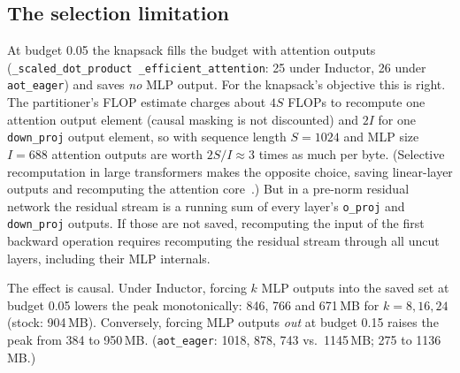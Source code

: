\documentclass[10pt]{article}
\newcommand{\code}[1]{\texttt{#1}}
\begin{document}
\subsection{The selection limitation}
At budget 0.05 the knapsack fills the budget with attention outputs (\code{\_scaled\_dot\_product\allowbreak
\_efficient\_attention}: 25 under Inductor, 26 under \code{aot\_eager}) and saves \emph{no} MLP output. For the knapsack's
objective this is right. The partitioner's FLOP estimate charges about $4S$ FLOPs to recompute one attention output
element (causal masking is not discounted) and $2I$ for one \code{down\_proj} output element, so with sequence length
$S=1024$ and MLP size $I=688$ attention outputs are worth $2S/I\approx3$ times as much per byte. (Selective recomputation in large transformers makes the opposite choice, saving linear-layer outputs and recomputing
the attention core~\citep{korthikanti2023reducing}.) But in a pre-norm residual network the residual stream is a running sum of every layer's
\code{o\_proj} and \code{down\_proj} outputs. If those are not saved, recomputing the input of the first backward
operation requires recomputing the residual stream through all uncut layers, including their MLP internals.

The effect is causal. Under Inductor, forcing $k$ MLP outputs into the saved set at budget 0.05 lowers the peak
monotonically: 846, 766 and 671\,MB for $k=8,16,24$ (stock: 904\,MB). Conversely, forcing MLP outputs \emph{out} at
budget 0.15 raises the peak from 384 to 950\,MB. (\code{aot\_eager}: 1018, 878, 743 vs.\ 1145\,MB; 275 to 1136\,MB.)
\end{document}

